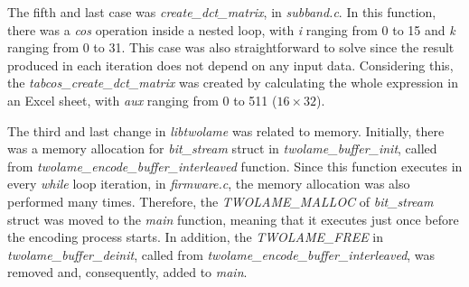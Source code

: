 \begin{comment}
\begin{figure}[H]
\centerline{\texttt{[image: fft.pdf]}}
\caption{\textit{psycho\_3\_fft} function.}
\label{fft}
\end{figure}

\vspace{1cm}
\end{comment}

The fifth and last case was \textit{create\_dct\_matrix}, in \textit{subband.c}. In this function, there was a \textit{cos} operation inside a nested loop, with \textit{i} ranging from 0 to 15 and \textit{k} ranging from 0 to 31. This case was also straightforward to solve since the result produced in each iteration does not depend on any input data. Considering this, the \textit{tabcos\_create\_dct\_matrix} was created by calculating the whole expression in an Excel sheet, with \textit{aux} ranging from 0 to 511 ($16 \times 32$).

\begin{comment}
\begin{figure}[H]
\centerline{\fbox{\texttt{[image: dct.pdf]}}}
\caption{\textit{create\_dct\_matrix} function.}
\label{dct}
\end{figure}

\vspace{1cm}
\end{comment}

The third and last change in \textit{libtwolame} was related to memory.
Initially, there was a memory allocation for \textit{bit\_stream} struct in \textit{twolame\_buffer\_init}, called from \textit{twolame\_encode\_buffer\_interleaved} function. Since this function executes in every \textit{while} loop iteration, in \textit{firmware.c}, the memory allocation was also performed many times.
Therefore, the \textit{TWOLAME\_MALLOC} of \textit{bit\_stream} struct was moved to the \textit{main} function, meaning that it executes just once before the encoding process starts.
In addition, the \textit{TWOLAME\_FREE} in \textit{twolame\_buffer\_deinit}, called from \textit{twolame\_encode\_buffer\_interleaved}, was removed and, consequently, added to \textit{main}.



